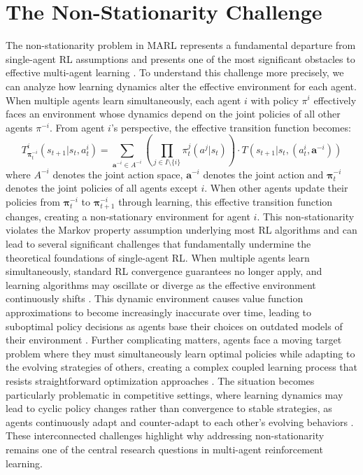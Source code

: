 \section{The Non-Stationarity Challenge}
The non-stationarity problem in MARL represents a fundamental departure from single-agent RL assumptions and presents one of the most significant obstacles to effective multi-agent learning \cite{hernandez2017survey, papoudakis2019dealing}. To understand this challenge more precisely, we can analyze how learning dynamics alter the effective environment for each agent. When multiple agents learn simultaneously, each agent $i$ with policy $\pi^i$ effectively faces an environment whose dynamics depend on the joint policies of all other agents $\pi^{-i}$. From agent $i$'s perspective, the effective transition function becomes:
\begin{equation}
    T^i_{\boldsymbol{\pi}^{-i}_t}(s_{t+1}|s_t, a^i_t) = \sum_{\mathbf{a}^{-i} \in A^{-i}} \left(\prod_{j \in I \setminus \{i\}} \pi^j_t(a^j|s_t)\right) \cdot T(s_{t+1}|s_t, (a^i_t, \mathbf{a}^{-i}))
\end{equation}
where $A^{-i}$ denotes the joint action space, $\mathbf{a}^{-i}$ denotes the joint action and $\boldsymbol{\pi}^{-i}_t$ denotes the joint policies of all agents except $i$. When other agents update their policies from $\boldsymbol{\pi}^{-i}_t$ to $\boldsymbol{\pi}^{-i}_{t+1}$ through learning, this effective transition function changes, creating a non-stationary environment for agent $i$. This non-stationarity violates the Markov property assumption underlying most RL algorithms and can lead to several significant challenges that fundamentally undermine the theoretical foundations of single-agent RL. When multiple agents learn simultaneously, standard RL convergence guarantees no longer apply, and learning algorithms may oscillate or diverge as the effective environment continuously shifts \cite{bowling2002multiagent}. This dynamic environment causes value function approximations to become increasingly inaccurate over time, leading to suboptimal policy decisions as agents base their choices on outdated models of their environment \cite{lauer2000algorithm}. Further complicating matters, agents face a moving target problem where they must simultaneously learn optimal policies while adapting to the evolving strategies of others, creating a complex coupled learning process that resists straightforward optimization approaches \cite{laurent2011world}. The situation becomes particularly problematic in competitive settings, where learning dynamics may lead to cyclic policy changes rather than convergence to stable strategies, as agents continuously adapt and counter-adapt to each other's evolving behaviors \cite{balduzzi2018mechanics}. These interconnected challenges highlight why addressing non-stationarity remains one of the central research questions in multi-agent reinforcement learning.


